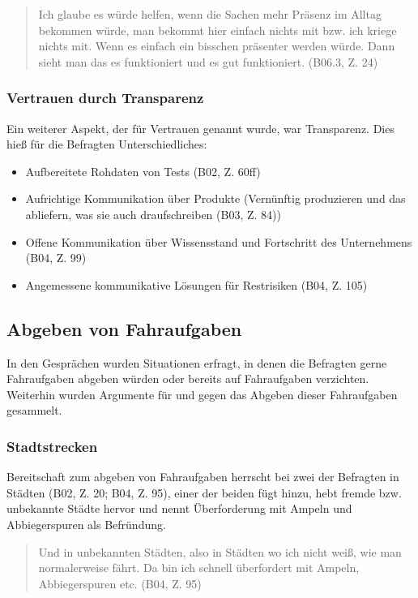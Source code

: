 \documentclass[12pt]{article}
\begin{document}
\begin{quote}
  Ich glaube es würde helfen, wenn die Sachen mehr Präsenz im Alltag bekommen würde, man bekommt hier einfach nichts mit bzw. ich kriege nichts mit. Wenn es einfach ein bisschen präsenter werden würde. Dann sieht man das es funktioniert und es gut funktioniert. (B06.3, Z. 24)
\end{quote}

\subsubsection*{Vertrauen durch Transparenz}
Ein weiterer Aspekt, der für Vertrauen genannt wurde, war Transparenz. Dies hieß für die Befragten Unterschiedliches:
\begin{itemize}
  \item Aufbereitete Rohdaten von Tests (B02, Z. 60ff)
  \item Aufrichtige Kommunikation über Produkte (\glqq Vernünftig produzieren und das abliefern, was sie auch draufschreiben\grqq{} (B03, Z. 84))
  \item Offene Kommunikation über Wissensstand und Fortschritt des Unternehmens (B04, Z. 99)
  \item Angemessene kommunikative Lösungen für Restrisiken (B04, Z. 105)
\end{itemize}

\subsection{Abgeben von Fahraufgaben}
In den Gesprächen wurden Situationen erfragt, in denen die Befragten gerne Fahraufgaben abgeben würden oder bereits auf Fahraufgaben verzichten. Weiterhin wurden Argumente für und gegen das Abgeben dieser Fahraufgaben gesammelt.

\subsubsection*{Stadtstrecken}
Bereitschaft zum abgeben von Fahraufgaben herrscht bei zwei der Befragten in Städten (B02, Z. 20; B04, Z. 95), einer der beiden fügt hinzu, hebt fremde bzw. unbekannte Städte hervor und nennt Überforderung mit Ampeln und Abbiegerspuren als Befründung.

\begin{quote}
  Und in unbekannten Städten, also in Städten wo ich nicht weiß, wie man normalerweise fährt. Da bin ich schnell überfordert mit Ampeln, Abbiegerspuren etc. (B04, Z. 95)
\end{quote}
\end{document}
